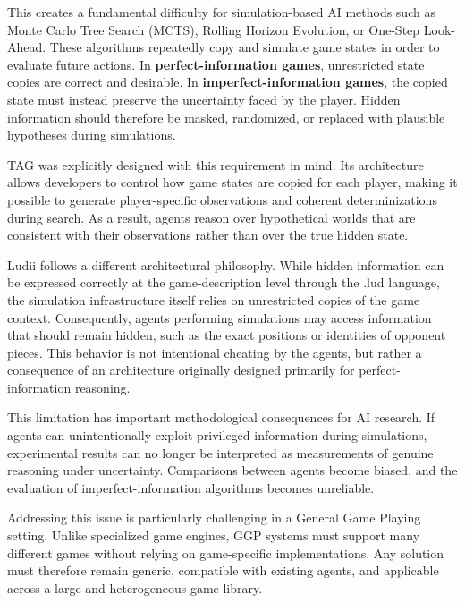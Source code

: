 This creates a fundamental difficulty for simulation-based AI methods such as Monte Carlo Tree Search (MCTS)\cite{browne2012survey}, Rolling Horizon Evolution\cite{perez2018rolling}, or One-Step Look-Ahead\cite{gaina2020tag}. These algorithms repeatedly copy and simulate game states in order to evaluate future actions. In \textbf{perfect-information games}, unrestricted state copies are correct and desirable. In \textbf{imperfect-information games}, the copied state must instead preserve the uncertainty faced by the player. Hidden information should therefore be masked, randomized, or replaced with plausible hypotheses during simulations\cite{cowling2012information}.

TAG was explicitly designed with this requirement in mind. Its architecture allows developers to control how game states are copied for each player, making it possible to generate player-specific observations and coherent determinizations during search. As a result, agents reason over hypothetical worlds that are consistent with their observations rather than over the true hidden state.

Ludii follows a different architectural philosophy. While hidden information can be expressed correctly at the game-description level through the .lud language, the simulation infrastructure itself relies on unrestricted copies of the game context\cite{soemers2021playouts}. Consequently, agents performing simulations may access information that should remain hidden, such as the exact positions or identities of opponent pieces. This behavior is not intentional cheating by the agents, but rather a consequence of an architecture originally designed primarily for perfect-information reasoning.

This limitation has important methodological consequences for AI research. If agents can unintentionally exploit privileged information during simulations, experimental results can no longer be interpreted as measurements of genuine reasoning under uncertainty. Comparisons between agents become biased, and the evaluation of imperfect-information algorithms becomes unreliable.

Addressing this issue is particularly challenging in a General Game Playing setting. Unlike specialized game engines, GGP systems must support many different games without relying on game-specific implementations. Any solution must therefore remain generic, compatible with existing agents, and applicable across a large and heterogeneous game library.


